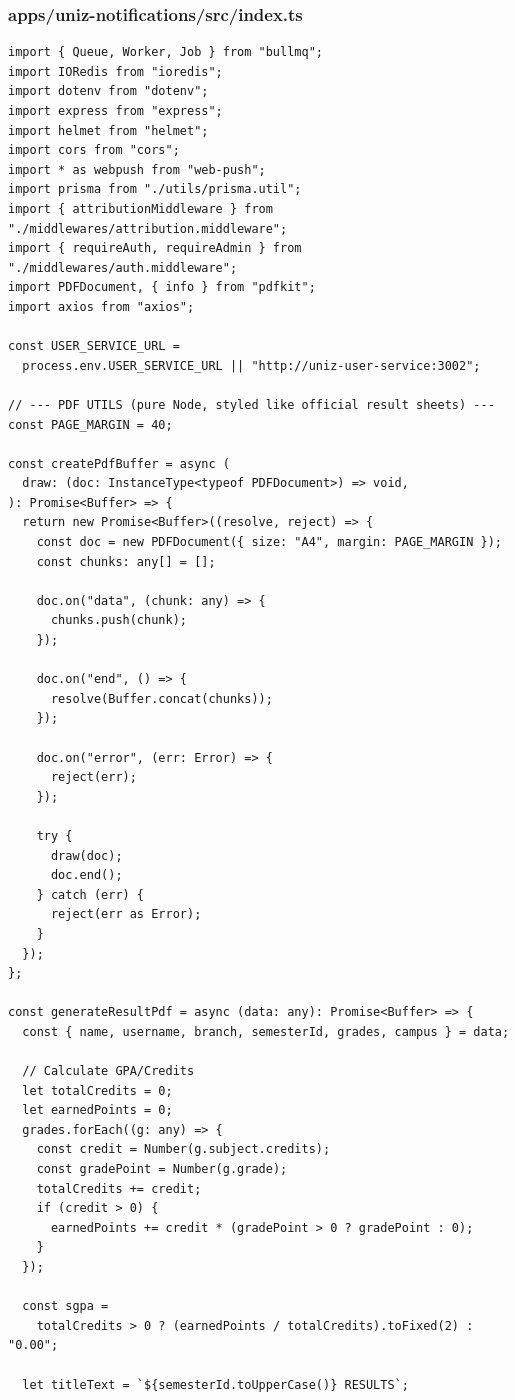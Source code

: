 \documentclass[11pt,a4paper,oneside]{article}
\begin{document}
\subsubsection*{apps/uniz-notifications/src/index.ts}
\begin{lstlisting}
import { Queue, Worker, Job } from "bullmq";
import IORedis from "ioredis";
import dotenv from "dotenv";
import express from "express";
import helmet from "helmet";
import cors from "cors";
import * as webpush from "web-push";
import prisma from "./utils/prisma.util";
import { attributionMiddleware } from "./middlewares/attribution.middleware";
import { requireAuth, requireAdmin } from "./middlewares/auth.middleware";
import PDFDocument, { info } from "pdfkit";
import axios from "axios";

const USER_SERVICE_URL =
  process.env.USER_SERVICE_URL || "http://uniz-user-service:3002";

// --- PDF UTILS (pure Node, styled like official result sheets) ---
const PAGE_MARGIN = 40;

const createPdfBuffer = async (
  draw: (doc: InstanceType<typeof PDFDocument>) => void,
): Promise<Buffer> => {
  return new Promise<Buffer>((resolve, reject) => {
    const doc = new PDFDocument({ size: "A4", margin: PAGE_MARGIN });
    const chunks: any[] = [];

    doc.on("data", (chunk: any) => {
      chunks.push(chunk);
    });

    doc.on("end", () => {
      resolve(Buffer.concat(chunks));
    });

    doc.on("error", (err: Error) => {
      reject(err);
    });

    try {
      draw(doc);
      doc.end();
    } catch (err) {
      reject(err as Error);
    }
  });
};

const generateResultPdf = async (data: any): Promise<Buffer> => {
  const { name, username, branch, semesterId, grades, campus } = data;

  // Calculate GPA/Credits
  let totalCredits = 0;
  let earnedPoints = 0;
  grades.forEach((g: any) => {
    const credit = Number(g.subject.credits);
    const gradePoint = Number(g.grade);
    totalCredits += credit;
    if (credit > 0) {
      earnedPoints += credit * (gradePoint > 0 ? gradePoint : 0);
    }
  });

  const sgpa =
    totalCredits > 0 ? (earnedPoints / totalCredits).toFixed(2) : "0.00";

  let titleText = `${semesterId.toUpperCase()} RESULTS`;


\end{lstlisting}
\end{document}
